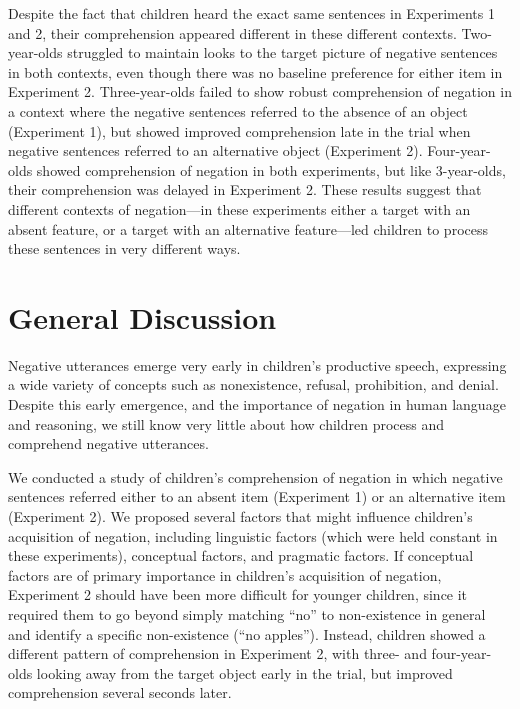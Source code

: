 \documentclass[man]{apa2}
\begin{document}
Despite the fact that children heard the exact same sentences in Experiments 1 and 2, their comprehension appeared different in these different contexts.  Two-year-olds struggled to maintain looks to the target picture of negative sentences in both contexts, even though there was no baseline preference for either item in Experiment 2.  Three-year-olds failed to show robust comprehension of negation in a context where the negative sentences referred to the absence of an object (Experiment 1), but showed improved comprehension late in the trial when negative sentences referred to an alternative object (Experiment 2).  Four-year-olds showed comprehension of negation in both experiments, but like 3-year-olds, their comprehension was delayed in Experiment 2.  These results suggest that different contexts of negation---in these experiments either a target with an absent feature, or a target with an alternative feature---led children to process these sentences in very different ways.  

\section{General Discussion}

Negative utterances emerge very early in children's productive speech, expressing a wide variety of concepts such as nonexistence, refusal, prohibition, and denial.  Despite this early emergence, and the importance of negation in human language and reasoning, we still know very little about how children process and comprehend negative utterances.  

We conducted a study of children's comprehension of negation in which negative sentences referred either to an absent item (Experiment 1) or an alternative item (Experiment 2).  We proposed several factors that might influence children's acquisition of negation, including linguistic factors (which were held constant in these experiments), conceptual factors, and pragmatic factors.  If conceptual factors are of primary importance in children's acquisition of negation, Experiment 2 should have been more difficult for younger children, since it required them to go beyond simply matching ``no'' to non-existence in general and identify a specific non-existence (``no apples'').  Instead, children showed a different pattern of comprehension in Experiment 2, with three- and four-year-olds looking away from the target object early in the trial, but improved comprehension several seconds later.  
\end{document}
